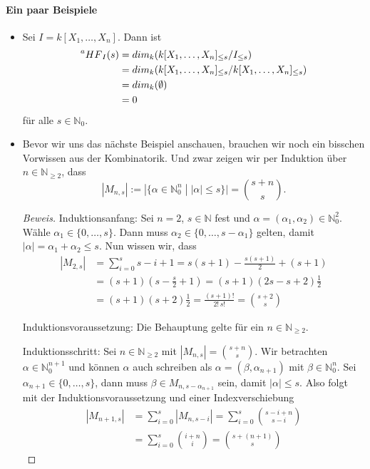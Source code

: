 \documentclass{article}
\newcommand*{\R}{k[X_{1},\ldots,X_{n}]}
\begin{document}
	\paragraph{Ein paar Beispiele}
	\begin{itemize}
	\item Sei \(I = \R\). Dann ist
		\begin{align*}
			\prescript{a}{}{HF}_{I}(s) &= dim_{k}(\R_{\leq s}/I_{\leq s}) \\
			&= dim_{k}(\R_{\leq s}/\R_{\leq s}) \\
			&= dim_{k}(\emptyset) \\
			&= 0
		\end{align*}
	 für alle \(s \in \mathbb{N}_{0}\).  
	\item Bevor wir uns das nächste Beispiel anschauen, brauchen wir noch ein bisschen Vorwissen
	aus der Kombinatorik. Und zwar zeigen wir per Induktion über \(n \in \mathbb{N}_{\geq 2}\),
	dass
	\begin{displaymath}
		|M_{n,s}| := |\{\alpha \in \mathbb{N}^{n}_{0}\; |\; |\alpha| \leq s \}| = \binom{s + n}{s}.
	\end{displaymath}
	
	\begin{proof}[Beweis]
	Induktionsanfang: Sei \(n = 2\), \(s \in \mathbb{N}\) fest und \(\alpha = (\alpha_{1}, 
	\alpha_{2}) \in \mathbb{N}^{2}_{0}\). Wähle \(\alpha_{1} \in \{0, \ldots, s\}\). Dann muss
	\(\alpha_{2} \in \{0, \ldots, s - \alpha_{1}\}\) gelten, damit \(|\alpha| = \alpha_{1} +
	\alpha_{2} \leq s\). Nun wissen wir, dass
	\begin{align*}
		|M_{2,s}| &= \sum_{i=0}^{s} s-i+1 = s(s+1) - \frac{s(s+1)}{2} + (s+1) \\
		&= (s+1)(s - \frac{s}{2} + 1) = (s+1)(2s - s +2)\frac{1}{2} \\
		&= (s+1)(s+2)\frac{1}{2} = \frac{(s+1)!}{2!\,s!} = \binom{s+2}{s}
	\end{align*}
	
	Induktionsvoraussetzung: Die Behauptung gelte für ein \(n \in \mathbb{N}_{\geq 2}\).

	Induktionsschritt: Sei \(n \in \mathbb{N}_{\geq 2}\) mit \(|M_{n,s}| = \binom{s + n}{s}\). Wir
	betrachten \(\alpha \in \mathbb{N}^{n+1}_{0}\) und können \(\alpha\) auch schreiben als
	\(\alpha = (\beta, \alpha_{n+1})\) mit \(\beta \in \mathbb{N}^{n}_{0}\). Sei \(\alpha_{n+1}
	\in \{0, \ldots, s\}\), dann muss \(\beta \in M_{n,s-\alpha_{n+1}}\) sein, damit
	\(|\alpha| \leq s\). Also folgt mit der Induktionsvoraussetzung und einer Indexverschiebung
	\begin{align*}
		|M_{n+1,s}| &= \sum_{i=0}^{s} |M_{n,s-i}| = \sum_{i=0}^{s} \binom{s-i+n}{s-i} \\
		&= \sum_{i=0}^{s} \binom{i+n}{i} = \binom{s+(n+1)}{s}
	\end{align*}


\end{proof}
\end{itemize}
\end{document}
